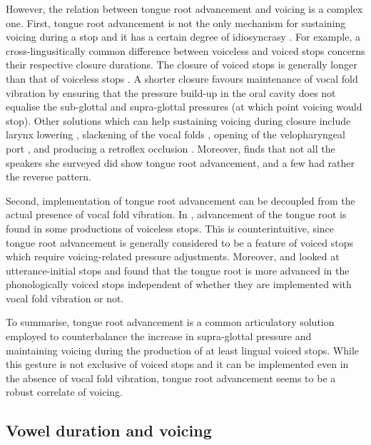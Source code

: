 \documentclass[12pt,]{article}
\begin{document}
However, the relation between tongue root advancement and voicing is a
complex one. First, tongue root advancement is not the only mechanism
for sustaining voicing during a stop
\citep{rothenberg1967, westbury1983, ohala2011} and it has a certain
degree of idiosyncrasy \citep{ahn2018}. For example, a
cross-lingusitically common difference between voiceless and voiced
stops concerns their respective closure durations. The closure of voiced
stops is generally longer than that of voiceless stops
\citep{lisker1957, umeda1977, van-summers1987, davis1989, de-jong1991}.
A shorter closure favours maintenance of vocal fold vibration by
ensuring that the pressure build-up in the oral cavity does not equalise
the sub-glottal and supra-glottal pressures (at which point voicing
would stop). Other solutions which can help sustaining voicing during
closure include larynx lowering \citep{riordan1980}, slackening of the
vocal folds \citet{halle1967}, opening of the velopharyngeal port
\citep{yanagihara1966}, and producing a retroflex occlusion
\citep{sprouse2008}. Moreover, \citep{ahn2018} finds that not all the
speakers she surveyed did show tongue root advancement, and a few had
rather the reverse pattern.

Second, implementation of tongue root advancement can be decoupled from
the actual presence of vocal fold vibration. In \citet{westbury1983},
advancement of the tongue root is found in some productions of voiceless
stops. This is counterintuitive, since tongue root advancement is
generally considered to be a feature of voiced stops which require
voicing-related pressure adjustments. Moreover, \citet{ahn2015, ahn2018}
and \citet{ahn2016} looked at utterance-initial stops and found that the
tongue root is more advanced in the phonologically voiced stops
independent of whether they are implemented with vocal fold vibration or
not.

To summarise, tongue root advancement is a common articulatory solution
employed to counterbalance the increase in supra-glottal pressure and
maintaining voicing during the production of at least lingual voiced
stops. While this gesture is not exclusive of voiced stops and it can be
implemented even in the absence of vocal fold vibration, tongue root
advancement seems to be a robust correlate of voicing.

\hypertarget{vowel-duration-and-voicing}{%
\subsection{Vowel duration and
voicing}\label{vowel-duration-and-voicing}}
\end{document}
